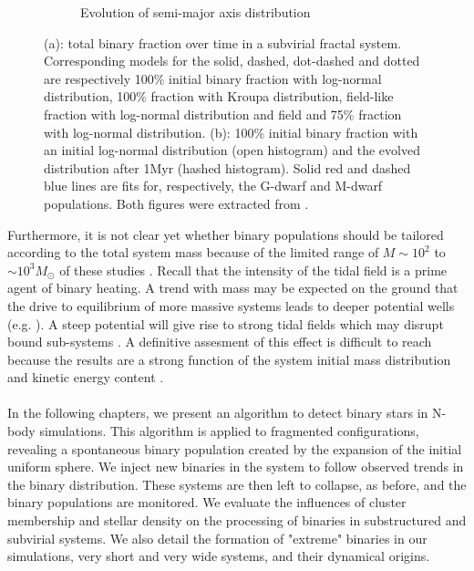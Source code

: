 \begin{figure}
\begin{subfigure}[b]{0.48\textwidth}
        \caption{Evolution of semi-major axis distribution}
        \label{Fig:0_binsim_2}
    \end{subfigure}
\caption{(a): total binary fraction over time in a subvirial fractal system. Corresponding models for the solid, dashed, dot-dashed and dotted are respectively 100\% initial binary fraction with log-normal distribution, 100\% fraction with Kroupa distribution, field-like fraction with log-normal distribution and field and 75\% fraction with log-normal distribution. (b): 100\% initial binary fraction with an initial log-normal distribution (open histogram) and the evolved distribution after 1Myr (hashed histogram). Solid red and dashed blue lines are fits for, respectively, the G-dwarf and M-dwarf populations. Both figures were extracted from \cite{Parker2011}.}
\label{Fig:0_binsimulation}
\end{figure}

 
 
   Furthermore, it is not clear yet whether binary populations should be tailored according to the total system mass because of the limited range of $M \sim 10^2$ to $ \sim 10^3 M_\odot$ of these studies \citep{Kroupa2001,Parker2011,Parker2014}. Recall that the intensity of the tidal field is a prime agent of binary heating.  A trend with mass may be expected on the ground that the drive to equilibrium of more massive systems leads to deeper potential wells (e.g. \citealt{Aarseth1988,Boily2002}). A steep potential will give rise to strong tidal fields which may disrupt bound sub-systems \citep{Boily2004,Renaud2011}. A definitive assesment of this effect is difficult to reach because the results are a strong function of the system initial mass distribution and kinetic energy content \citep{Boily2002,Caputo2014}.
  
  
\paragraph*{}
In the following chapters, we present an algorithm to detect binary stars in N-body simulations. This algorithm is applied to \HubLem fragmented configurations, revealing a spontaneous binary population created by the expansion of the initial uniform sphere. We inject new binaries in the system to follow observed trends in the binary distribution. These systems are then left to collapse, as before, and the binary populations are monitored. We evaluate the influences of cluster membership and stellar density on the processing of binaries in substructured and subvirial systems. We also detail the formation of "extreme" binaries in our simulations, very short and very wide systems, and their dynamical origins.








